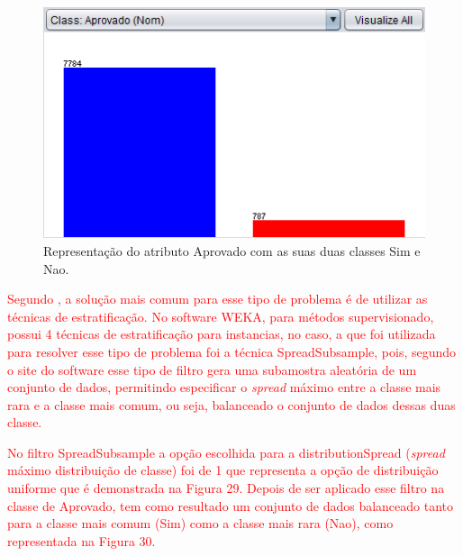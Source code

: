 \par
\begin{figure}[!htp]
	\begin{center}
    \caption{\label{fig:waveform_fig} Representação do atributo Aprovado com as suas duas classes Sim e Nao.}
	\includegraphics[scale=0.90]{Figuras/Atributo_aprovado.png}
	\end{center}
\end{figure}

\par
\textcolor{red}{}


\par
\textcolor{red}{Segundo , a solução mais comum para esse tipo de problema é de utilizar as técnicas de estratificação. No software WEKA, para métodos supervisionado, possui 4 técnicas de estratificação para instancias, no caso, a que foi utilizada para resolver esse tipo de problema foi a técnica SpreadSubsample, pois, segundo o site do software  esse tipo de filtro gera uma subamostra aleatória de um conjunto de dados, permitindo especificar o \textit{spread} máximo entre a classe mais rara e a classe mais comum, ou seja, balanceado o conjunto de dados dessas duas classe.}

\par
\textcolor{red}{No filtro SpreadSubsample a opção escolhida para a distributionSpread (\textit{spread} máximo distribuição de classe) foi de 1 que representa a opção de distribuição uniforme que é demonstrada na Figura 29. Depois de ser aplicado esse filtro na classe de Aprovado, tem como resultado um conjunto de dados balanceado tanto para a classe mais comum (Sim) como a classe mais rara (Nao), como representada na Figura 30.}

